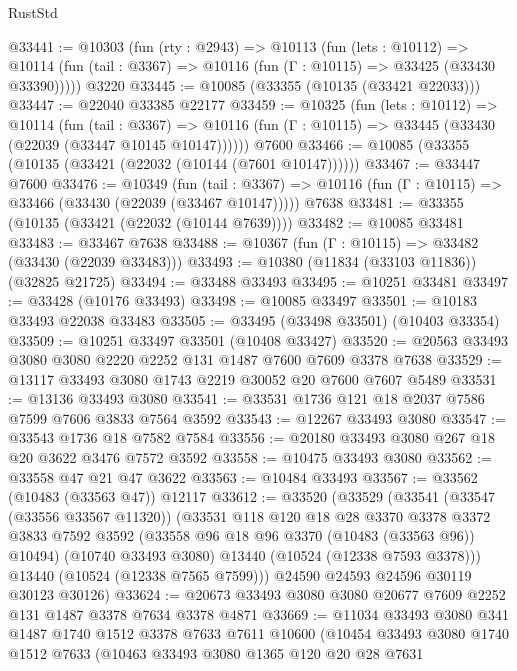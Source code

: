 \begin{lexlean}{RustStd}
\begin{coremodule}
@33441 := @10303
    (fun (rty : @2943) =>
    @10113
      (fun (lets : @10112) =>
      @10114 (fun (tail : @3367) => @10116 (fun (Γ : @10115) => @33425 (@33430 @33390)))))
    @3220
@33445 := @10085 (@33355 (@10135 (@33421 @22033)))
@33447 := @22040 @33385 @22177
@33459 := @10325
    (fun (lets : @10112) =>
    @10114
      (fun (tail : @3367) =>
      @10116 (fun (Γ : @10115) => @33445 (@33430 (@22039 (@33447 @10145 @10147))))))
    @7600
@33466 := @10085 (@33355 (@10135 (@33421 (@22032 (@10144 (@7601 @10147))))))
@33467 := @33447 @7600
@33476 := @10349
    (fun (tail : @3367) => @10116 (fun (Γ : @10115) => @33466 (@33430 (@22039 (@33467 @10147)))))
    @7638
@33481 := @33355 (@10135 (@33421 (@22032 (@10144 @7639))))
@33482 := @10085 @33481
@33483 := @33467 @7638
@33488 := @10367 (fun (Γ : @10115) => @33482 (@33430 (@22039 @33483)))
@33493 := @10380 (@11834 (@33103 @11836)) (@32825 @21725)
@33494 := @33488 @33493
@33495 := @10251 @33481
@33497 := @33428 (@10176 @33493)
@33498 := @10085 @33497
@33501 := @10183 @33493 @22038 @33483
@33505 := @33495 (@33498 @33501) (@10403 @33354)
@33509 := @10251 @33497 @33501 (@10408 @33427)
@33520 := @20563 @33493 @3080 @3080 @2220 @2252 @131 @1487 @7600 @7609 @3378 @7638
@33529 := @13117 @33493 @3080 @1743 @2219 @30052 @20 @7600 @7607 @5489
@33531 := @13136 @33493 @3080
@33541 := @33531 @1736 @121 @18 @2037 @7586 @7599 @7606 @3833 @7564 @3592
@33543 := @12267 @33493 @3080
@33547 := @33543 @1736 @18 @7582 @7584
@33556 := @20180 @33493 @3080 @267 @18 @20 @3622 @3476 @7572 @3592
@33558 := @10475 @33493 @3080
@33562 := @33558 @47 @21 @47 @3622
@33563 := @10484 @33493
@33567 := @33562 (@10483 (@33563 @47)) @12117
@33612 := @33520
    (@33529
      (@33541
        (@33547 (@33556 @33567 @11320))
        (@33531
          @118
          @120
          @18
          @28
          @3370
          @3378
          @3372
          @3833
          @7592
          @3592
          (@33558 @96 @18 @96 @3370 (@10483 (@33563 @96)) @10494)
          (@10740 @33493 @3080)
          @13440
          (@10524 (@12338 @7593 @3378)))
        @13440
        (@10524 (@12338 @7565 @7599)))
      @24590
      @24593
      @24596
      @30119
      @30123
      @30126)
@33624 := @20673 @33493 @3080 @3080 @20677 @7609 @2252 @131 @1487 @3378 @7634 @3378 @4871
@33669 := @11034
    @33493
    @3080
    @341
    @1487
    @1740
    @1512
    @3378
    @7633
    @7611
    @10600
    (@10454
      @33493
      @3080
      @1740
      @1512
      @7633
      (@10463
        @33493
        @3080
        @1365
        @120
        @20
        @28
        @7631

\end{coremodule}
\end{lexlean}
